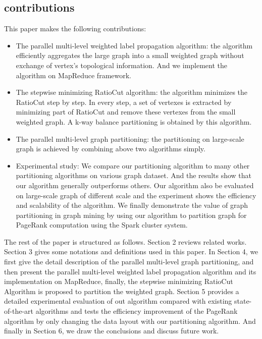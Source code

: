 \documentclass{acm_proc_article-sp}
\begin{document}
\subsection{ contributions}
This paper makes the following contributions:
\begin{itemize}
\item The parallel multi-level weighted label propagation algorithm: the algorithm efficiently aggregates the large graph into a small weighted graph without exchange of vertex's topological information. And we implement the algorithm on MapReduce framework.
\item The stepwise minimizing RatioCut algorithm: the algorithm minimizes the RatioCut step by step. In every step, a set of vertexes is extracted by minimizing part of RatioCut and remove these vertexes from the small weighted graph. A k-way balance partitioning is obtained by this algorithm.
\item The parallel multi-level graph partitioning: the partitioning on large-scale graph is achieved by combining above two algorithms simply.
\item Experimental study: We compare our partitioning algorithm to many other partitioning algorithms on various graph dataset. And the results show that our algorithm generally outperforms others. Our algorithm also be evaluated on large-scale graph of different scale and the experiment shows the efficiency and scalability of the algorithm. We finally demonstrate the value of graph partitioning in graph mining by using our algorithm to partition graph for PageRank computation using the Spark cluster system.
\end{itemize}
\par
The rest of the paper is structured as follows. Section 2 reviews related works. Section 3 gives some notations and definitions used in this paper. In Section 4, we first give the detail description of the parallel multi-level graph partitioning, and then present the parallel multi-level weighted label propagation algorithm and its implementation on MapReduce, finally, the stepwise minimizing RatioCut Algorithm is proposed to partition the weighted graph. Section 5 provides a detailed experimental evaluation of out algorithm compared with existing state-of-the-art algorithms and tests the efficiency improvement of the PageRank algorithm by only changing the data layout with our partitioning algorithm. And finally in Section 6, we draw the conclusions and discuss future work.
\end{document}
